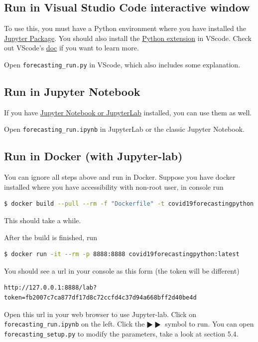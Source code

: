 \documentclass[a4paper,12pt]{article}
\begin{document}
\subsection{Run in Visual Studio Code interactive window
}
To use this, you must have a Python environment where you have installed the \href{https://pypi.org/project/jupyter/}{Jupyter Package}. You should also install the  \href{https://marketplace.visualstudio.com/items?itemName=ms-python.python}{Python extension} in VScode. Check out VScode's \href{https://code.visualstudio.com/docs/python/jupyter-support-py}{doc} if you want to learn more.

Open \texttt{forecasting\_run.py} in VScode, which also includes some explanation.

\subsection{Run in Jupyter Notebook}
If you have \href{https://jupyter.org/install.html}{Jupyter Notebook or JupyterLab} installed, you can use them as well.

Open \texttt{forecasting\_run.ipynb} in JupyterLab or the classic Jupyter Notebook.
\subsection{Run in Docker (with Jupyter-lab)}
You can ignore all steps above and run in Docker. Suppose you have docker installed where you have accessibility with non-root user, in console run 
\begin{lstlisting}[language=bash]
$ docker build --pull --rm -f "Dockerfile" -t covid19forecastingpython:latest "." 
\end{lstlisting}
This should take a while.

After the build is finished, run 
\begin{lstlisting}[language=bash]
$ docker run -it --rm -p 8888:8888 covid19forecastingpython:latest 
\end{lstlisting}
You should see a url in your console as this form (the token will be different)
\begin{lstlisting}
http://127.0.0.1:8888/lab?token=fb2007c7ca877df17d8c72ccfd4c37d94a668bff2d40be4d
\end{lstlisting}
Open this url in your web browser to use Jupyter-lab. Click on\\ \texttt{forecasting\_run.ipynb} on the left. Click the $\RHD \RHD$ symbol to run. You can open \texttt{forecasting\_setup.py} to modify the parameters, take a look at section 5.4.
\end{document}
